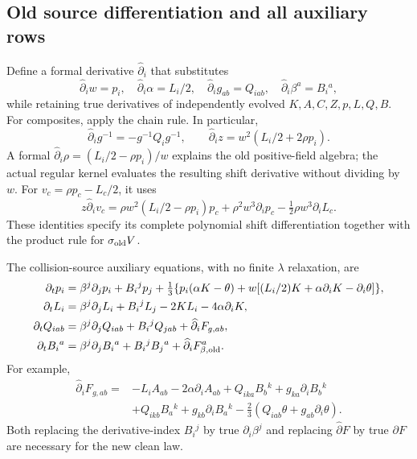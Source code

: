 \documentclass[11pt,letterpaper]{article}
\begin{document}
\subsection{Old source differentiation and all auxiliary rows}
Define a formal derivative $\widehat\partial_i$ that substitutes
\begin{equation}
\widehat\partial_iw=p_i,\quad \widehat\partial_i\alpha=L_i/2,\quad
\widehat\partial_ig_{ab}=Q_{iab},\quad
\widehat\partial_i\beta^a=B_i{}^a,
\end{equation}
while retaining true derivatives of independently evolved $K,A,C,Z,p,L,Q,B$. For composites, apply the chain rule. In particular,
\begin{equation}
\widehat\partial_ig^{-1}=-g^{-1}Q_i g^{-1},\qquad
\widehat\partial_i z=w^2(L_i/2+2\rho p_i).
\end{equation}
A formal $\widehat\partial_i\rho=(L_i/2-\rho p_i)/w$ explains the old positive-field algebra; the actual regular kernel evaluates the resulting shift derivative without dividing by $w$. For $v_c=\rho p_c-L_c/2$, it uses
\begin{equation}
z\widehat\partial_i v_c
=\rho w^2(L_i/2-\rho p_i)p_c+\rho^2w^3\partial_ip_c
-\tfrac12\rho w^3\partial_iL_c.
\end{equation}
These identities specify its complete polynomial shift differentiation together with the product rule for $\sigma_{\rm old}V$.

The collision-source auxiliary equations, with no finite $\lambda$ relaxation, are
\begin{align}
\partial_tp_i={}&\beta^j\partial_jp_i+B_i{}^jp_j
+\tfrac13\{p_i(\alpha K-\theta)+w[(L_i/2)K+\alpha\partial_iK-\partial_i\theta]\},\\
\partial_tL_i={}&\beta^j\partial_jL_i+B_i{}^jL_j-2KL_i-4\alpha\partial_iK,\\
\partial_tQ_{iab}={}&\beta^j\partial_jQ_{iab}+B_i{}^jQ_{jab}
+\widehat\partial_iF_{g,ab},\\
\partial_tB_i{}^a={}&\beta^j\partial_jB_i{}^a+B_i{}^jB_j{}^a
+\widehat\partial_iF_{\beta,\rm old}^a.
\end{align}
For example,
\begin{align}
\widehat\partial_iF_{g,ab}={}&-L_iA_{ab}-2\alpha\partial_iA_{ab}
+Q_{ika}B_b{}^k+g_{ka}\partial_iB_b{}^k\nonumber\\
&+Q_{ikb}B_a{}^k+g_{kb}\partial_iB_a{}^k
-\tfrac23(Q_{iab}\theta+g_{ab}\partial_i\theta).
\end{align}
Both replacing the derivative-index $B_i{}^j$ by true $\partial_i\beta^j$ and replacing $\widehat\partial F$ by true $\partial F$ are necessary for the new clean law.
\end{document}
